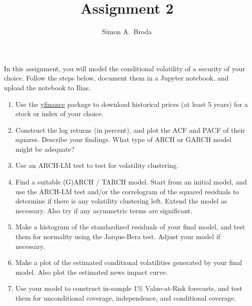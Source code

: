 \documentclass[11pt, a4paper]{article}
\begin{document}
\title{Assignment 2}
\author{Simon A.\ Broda}
\date{}
\maketitle
In this assignment, you will model the conditional volatility of a security of your choice. Follow the steps below, document them in a Jupyter notebook, and upload the notebook to Ilias.
\begin{enumerate}
	\item Use the \href{https://aroussi.com/post/python-yahoo-finance}{yfinance} package to download historical prices (at least 5 years) for a stock or index of your choice.
	\item Construct the log returns (in percent), and plot the ACF and PACF of their squares. Describe your findings. What type of ARCH or GARCH model might be adequate?
    \item Use an ARCH-LM test to test for volatility clustering.
    \item Find a suitable (G)ARCH / TARCH model. Start from an initial model, and use the ARCH-LM test and/or the correlogram of the squared residuals to determine if there is any volatility clustering left. Extend the model as necessary. Also try if any asymmetric terms are significant.
    \item Make a histogram of the standardized residuals of your final model, and test them for normality using the Jarque-Bera test. Adjust your model if necessary.
    \item Make a plot of the estimated conditional volatilities generated by your final model. Also plot the estimated news impact curve.
    \item Use your model to construct in-sample 1\% Value-at-Risk forecasts, and test them for unconditional coverage, independence, and conditional coverage.
\end{enumerate}
\end{document}
